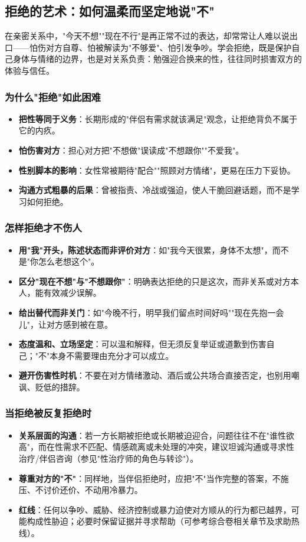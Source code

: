 \subsection{拒绝的艺术：如何温柔而坚定地说"不"}

在亲密关系中，"今天不想""现在不行"是再正常不过的表达，却常常让人难以说出口——怕伤对方自尊、怕被解读为"不够爱"、怕引发争吵。学会拒绝，既是保护自己身体与情绪的边界，也是对关系负责：勉强迎合换来的性，往往同时损害双方的体验与信任。

\subsubsection{为什么"拒绝"如此困难}
\begin{itemize}
	\item \textbf{把性等同于义务}：长期形成的"伴侣有需求就该满足"观念，让拒绝背负不属于它的内疚。
	\item \textbf{怕伤害对方}：担心对方把"不想做"误读成"不想跟你""不爱我"。
	\item \textbf{性别脚本的影响}：女性常被期待"配合""照顾对方情绪"，更易在压力下妥协。
	\item \textbf{沟通方式粗暴的后果}：曾被指责、冷战或强迫，使人干脆回避话题，而不是学习如何拒绝。
\end{itemize}

\subsubsection{怎样拒绝才不伤人}
\begin{itemize}
	\item \textbf{用"我"开头，陈述状态而非评价对方}：如"我今天很累，身体不太想"，而不是"你怎么老想这个"。
	\item \textbf{区分"现在不想"与"不想跟你"}：明确表达拒绝的只是这次，而非关系或对方本人，能有效减少误解。
	\item \textbf{给出替代而非关门}：如"今晚不行，明早我们留点时间好吗""现在先抱一会儿"，让对方感到被在意。
	\item \textbf{态度温和、立场坚定}：可以温和解释，但无须反复举证或道歉到伤害自己；"不"本身不需要理由充分才可以成立。
	\item \textbf{避开伤害性时机}：不要在对方情绪激动、酒后或公共场合直接否定，也别用嘲讽、贬低的措辞。
\end{itemize}

\subsubsection{当拒绝被反复拒绝时}
\begin{itemize}
	\item \textbf{关系层面的沟通}：若一方长期被拒绝或长期被迫迎合，问题往往不在"谁性欲高"，而在性需求不匹配、情感疏离或未处理的冲突，建议坦诚沟通或寻求性治疗/伴侣咨询（参见"性治疗师的角色与转诊"）。
	\item \textbf{尊重对方的"不"}：同样地，当伴侣拒绝时，应把"不"当作完整的答案，不施压、不讨价还价、不动用冷暴力。
	\item \textbf{红线}：任何以争吵、威胁、经济控制或暴力迫使对方顺从的行为都已越界，可能构成性胁迫；必要时保留证据并寻求帮助（可参考综合卷相关章节及求助热线）。
\end{itemize}

